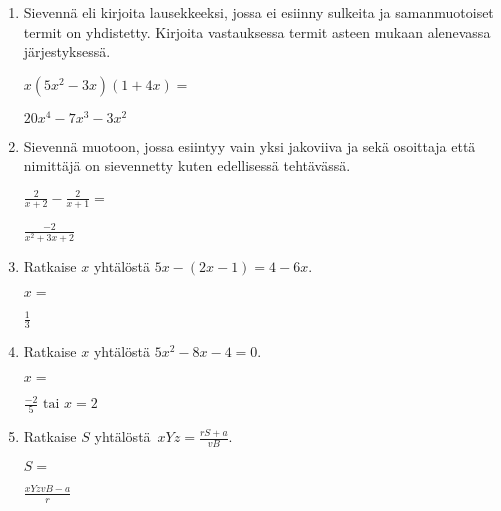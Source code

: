 \documentclass[finnish, a4paper, 12pt]{article}
\begin{document}
\begin{enumerate}[leftmargin=*]
		\vspace{8pt}
		
		\item %
		Sievennä eli kirjoita lausekkeeksi, jossa ei esiinny sulkeita ja 
		samanmuotoiset termit on yhdistetty. 
		Kirjoita vastauksessa termit asteen mukaan alenevassa järjestyksessä. 
		
		\(
		\displaystyle
		x(5x^2 - 3x)(1 + 4x) = 
		\) %
		\begin{version:withAnswers}
		\( 20x^4 -7x^3 -3x^2 \)
		\end{version:withAnswers}
		
		\vspace{8pt}
		
		\item %
		Sievennä %
		muotoon, jossa esiintyy vain yksi jakoviiva ja sekä osoittaja
		että nimittäjä on sievennetty kuten edellisessä tehtävässä.
		
		\(
		\displaystyle
		\frac{2}{x+2}- \frac{2}{x + 1} =
		\) %
		\begin{version:withAnswers}
		\( \frac{-2}{x^2+3x+2} \)
		\end{version:withAnswers}
		
		\vspace{8pt}
		
		\item %
		Ratkaise \(x\) yhtälöstä \(5x - (2x-1) = 4 - 6x\).
		
		\(
		x = 
		\)	%
		\begin{version:withAnswers}
		 \( \frac{1}{3} \)
		\end{version:withAnswers}
		\vspace{8pt}
		
		\item %
		Ratkaise \(x\) yhtälöstä \(5x^2-8x-4= 0\).
		
		\(
		x = 		
		\)	%
		
		\begin{version:withAnswers}
		\(\frac{-2}{5} \text{  tai } x = 2\)
		\end{version:withAnswers}
		\vspace{8pt}
		
		\item %
		Ratkaise \(S\) yhtälöstä 
		\(
		\displaystyle \,
		xYz = \frac{rS+a}{vB} .
		\)	
		
		\(
		S = 
		\) %
		\begin{version:withAnswers}
		\( \frac{xYzvB-a}{r}\)
		\end{version:withAnswers}
		
	\end{enumerate}
	
	
\end{document}
